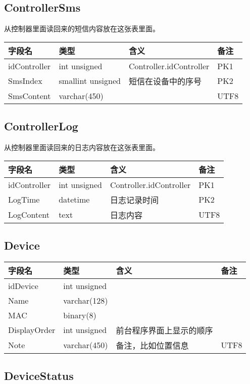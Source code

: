 \subsection{ControllerSms}\label{controllersms}

从控制器里面读回来的短信内容放在这张表里面。

\begin{longtabu}[c]{@{}lXXX@{}}
\toprule
字段名 & 类型 & 含义 & 备注\tabularnewline
\midrule
\endhead
idController & int unsigned & Controller.idController &
PK1\tabularnewline
SmsIndex & smallint unsigned & 短信在设备中的序号 & PK2\tabularnewline
SmsContent & varchar(450) & & UTF8\tabularnewline
\bottomrule
\end{longtabu}

\subsection{ControllerLog}\label{controllerlog}

从控制器里面读回来的日志内容放在这张表里面。

\begin{longtabu}[c]{@{}lXXX@{}}
\toprule
字段名 & 类型 & 含义 & 备注\tabularnewline
\midrule
\endhead
idController & int unsigned & Controller.idController &
PK1\tabularnewline
LogTime & datetime & 日志记录时间 & PK2\tabularnewline
LogContent & text & 日志内容 & UTF8\tabularnewline
\bottomrule
\end{longtabu}

\subsection{Device}\label{device}

\begin{longtabu}[c]{@{}lXXX@{}}
\toprule
字段名 & 类型 & 含义 & 备注\tabularnewline
\midrule
\endhead
idDevice & int unsigned & &\tabularnewline
Name & varchar(128) & &\tabularnewline
MAC & binary(8) & &\tabularnewline
DisplayOrder & int unsigned & 前台程序界面上显示的顺序 &\tabularnewline
Note & varchar(450) & 备注，比如位置信息 & UTF8\tabularnewline
\bottomrule
\end{longtabu}

\subsection{DeviceStatus}\label{devicestatus}

